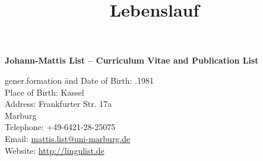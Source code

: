 \documentclass[xetex,11pt,a4paper]{moderncv}
\title{Lebenslauf}
\begin{document}
\pagestyle{plain}


\textbf{Johann-Mattis List -- Curriculum Vitae and Publication List}\\ 
\noindent\begin{tabbing}
    gener.formation \= and \kill
    \footnotesize Date of Birth:                      .1981 \\
    \footnotesize Place of Birth:                      \> Kassel \\
    \footnotesize Address:                         \> Frankfurter Str. 17a \\
    \footnotesize                                  {} Marburg \\
    \footnotesize Telephone:                        \> +49-6421-28-25075 \\
    \footnotesize Email:                           \> \url{mattis.list@uni-marburg.de} \\
    \footnotesize Website:\> \url{http://lingulist.de}\\
\end{tabbing}
\end{document}

